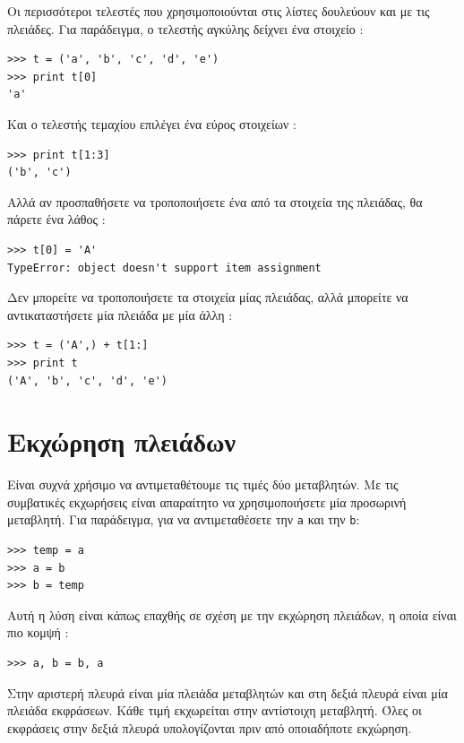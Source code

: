 \documentclass[10pt]{book}
\begin{document}
Οι περισσότεροι τελεστές που χρησιμοποιούνται στις λίστες δουλεύουν και με τις πλειάδες. Για παράδειγμα, ο τελεστής αγκύλης δείχνει ένα στοιχείο :

\begin{verbatim}
>>> t = ('a', 'b', 'c', 'd', 'e')
>>> print t[0]
'a'
\end{verbatim}
%
 Και ο τελεστής τεμαχίου επιλέγει ένα εύρος στοιχείων :

\begin{verbatim}
>>> print t[1:3]
('b', 'c')
\end{verbatim}
%
 Αλλά αν προσπαθήσετε να τροποποιήσετε ένα από τα στοιχεία της πλειάδας, θα πάρετε ένα λάθος :

\begin{verbatim}
>>> t[0] = 'A'
TypeError: object doesn't support item assignment
\end{verbatim}
%
 Δεν μπορείτε να τροποποιήσετε τα στοιχεία μίας πλειάδας, αλλά μπορείτε να αντικαταστήσετε μία πλειάδα με μία άλλη :

\begin{verbatim}
>>> t = ('A',) + t[1:]
>>> print t
('A', 'b', 'c', 'd', 'e')
\end{verbatim}
%

 
\section{Εκχώρηση πλειάδων}
\label{tuple.assignment}

Είναι συχνά χρήσιμο να αντιμεταθέτουμε τις τιμές δύο μεταβλητών. Με τις συμβατικές εκχωρήσεις είναι απαραίτητο να χρησιμοποιήσετε μία προσωρινή μεταβλητή. Για παράδειγμα, για να αντιμεταθέσετε την  {\tt a}  και την  {\tt b}:

\begin{verbatim}
>>> temp = a
>>> a = b
>>> b = temp
\end{verbatim}
%
 Αυτή η λύση είναι κάπως επαχθής σε σχέση με την εκχώρηση πλειάδων, η οποία είναι πιο κομψή :

\begin{verbatim}
>>> a, b = b, a
\end{verbatim}
%
 Στην αριστερή πλευρά είναι μία πλειάδα μεταβλητών και στη δεξιά πλευρά είναι μία πλειάδα εκφράσεων. Κάθε τιμή εκχωρείται στην αντίστοιχη μεταβλητή. Όλες οι εκφράσεις στην δεξιά πλευρά υπολογίζονται πριν από οποιαδήποτε εκχώρηση.
\end{document}

